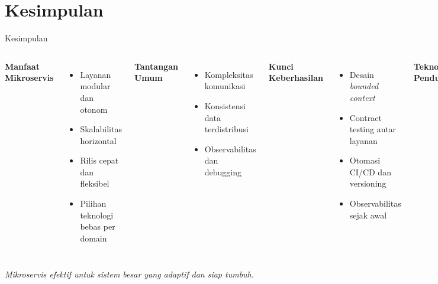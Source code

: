 \documentclass[aspectratio=169, table]{beamer}
\begin{document}
\section{Kesimpulan}
\begin{frame}[fragile]{Kesimpulan}
	\vspace{20pt}
	\small
	\begin{columns}[T]
		\textbf{Manfaat Mikroservis}
		\begin{itemize}
			\item Layanan modular dan otonom
			\item Skalabilitas horizontal
			\item Rilis cepat dan fleksibel
			\item Pilihan teknologi bebas per domain
		\end{itemize}
		
		\vspace{10pt}
		\textbf{Tantangan Umum}
		\begin{itemize}
			\item Kompleksitas komunikasi
			\item Konsistensi data terdistribusi
			\item Observabilitas dan debugging
		\end{itemize}
		
		\textbf{Kunci Keberhasilan}
		\begin{itemize}
			\item Desain \textit{bounded context}
			\item Contract testing antar layanan
			\item Otomasi CI/CD dan versioning
			\item Observabilitas sejak awal
		\end{itemize}
		
		\vspace{10pt}
		\textbf{Teknologi Pendukung}
		\begin{itemize}
			\item Docker, Kubernetes
			\item Prometheus, Grafana
			\item Spring Boot, Micronaut
		\end{itemize}
	\end{columns}
\vspace{10pt}
	\textit{Mikroservis efektif untuk sistem besar yang adaptif dan siap tumbuh.}
\end{frame}
\end{document}
